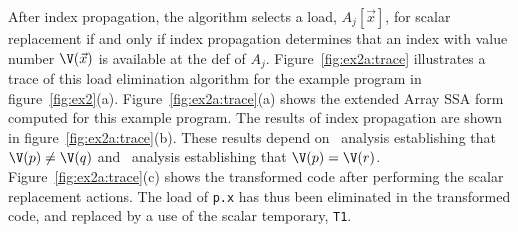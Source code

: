 
After index propagation, the algorithm selects a load,
$A_j[\vec{x}]$, for scalar replacement if and only if index propagation
determines that an index with value number $\V(\vec{x})$ is available at the 
def of $A_j$.
Figure~\ref{fig:ex2a:trace} illustrates a trace of this load
elimination algorithm for the example program in
figure~\ref{fig:ex2}(a).  Figure~\ref{fig:ex2a:trace}(a) shows the
extended Array SSA form computed for this example program.  The results
of index propagation are shown in figure~\ref{fig:ex2a:trace}(b).
These results depend on \dd\ analysis establishing that $\V(p) \not=
\V(q)$ and \ds\ analysis establishing that $\V(p) = \V(r)$.
Figure~\ref{fig:ex2a:trace}(c) shows the transformed code after
performing the scalar replacement actions.  The load of {\tt p.x}
has thus
been eliminated in the transformed code, and replaced by a use
of the scalar temporary, {\tt T1}.







